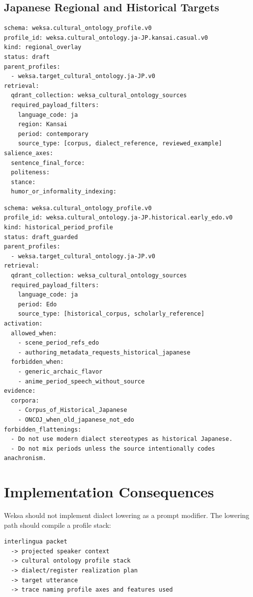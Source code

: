\documentclass[11pt]{article}
\begin{document}
\subsection{Japanese Regional and Historical Targets}

\begin{lstlisting}[basicstyle=\ttfamily\small,breaklines=true]
schema: weksa.cultural_ontology_profile.v0
profile_id: weksa.cultural_ontology.ja-JP.kansai.casual.v0
kind: regional_overlay
status: draft
parent_profiles:
  - weksa.target_cultural_ontology.ja-JP.v0
retrieval:
  qdrant_collection: weksa_cultural_ontology_sources
  required_payload_filters:
    language_code: ja
    region: Kansai
    period: contemporary
    source_type: [corpus, dialect_reference, reviewed_example]
salience_axes:
  sentence_final_force:
  politeness:
  stance:
  humor_or_informality_indexing:
\end{lstlisting}

\begin{lstlisting}[basicstyle=\ttfamily\small,breaklines=true]
schema: weksa.cultural_ontology_profile.v0
profile_id: weksa.cultural_ontology.ja-JP.historical.early_edo.v0
kind: historical_period_profile
status: draft_guarded
parent_profiles:
  - weksa.target_cultural_ontology.ja-JP.v0
retrieval:
  qdrant_collection: weksa_cultural_ontology_sources
  required_payload_filters:
    language_code: ja
    period: Edo
    source_type: [historical_corpus, scholarly_reference]
activation:
  allowed_when:
    - scene_period_refs_edo
    - authoring_metadata_requests_historical_japanese
  forbidden_when:
    - generic_archaic_flavor
    - anime_period_speech_without_source
evidence:
  corpora:
    - Corpus_of_Historical_Japanese
    - ONCOJ_when_old_japanese_not_edo
forbidden_flattenings:
  - Do not use modern dialect stereotypes as historical Japanese.
  - Do not mix periods unless the source intentionally codes anachronism.
\end{lstlisting}

\section{Implementation Consequences}

Weksa should not implement dialect lowering as a prompt modifier. The lowering
path should compile a profile stack:

\begin{lstlisting}[basicstyle=\ttfamily\small]
interlingua packet
  -> projected speaker context
  -> cultural ontology profile stack
  -> dialect/register realization plan
  -> target utterance
  -> trace naming profile axes and features used
\end{lstlisting}
\end{document}
